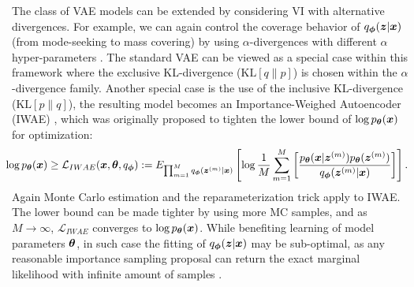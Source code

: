 The class of VAE models can be extended by considering VI with alternative divergences. For example, we can again control the coverage behavior of $q_{\bm{\phi}}(\bm{z}|\bm{x})$ (from mode-seeking to mass covering) by using $\alpha$-divergences with different $\alpha$ hyper-parameters \citep{miguel2015alpha,li2016renyi}. The standard VAE can be viewed as a special case within this framework where the exclusive KL-divergence ($\mathrm{KL}[q\|p]$) is chosen within the $\alpha$-divergence family. Another special case is the use of the inclusive KL-divergence ($\mathrm{KL}[p\|q]$), the resulting model becomes an Importance-Weighed Autoencoder (IWAE) \citep{burda2016iwae}, which was originally proposed to tighten the lower bound of $\log p_{\bm{\theta}}(\bm{x})$ for optimization:
%
\begin{equation}
\hspace{-0.7em}
\log p_{\bm{\theta}}(\bm{x}) \geq \mathcal{L}_{IWAE}(\bm{x}, \bm{\theta}, q_{\bm{\phi}})
:= E_{\prod_{m=1}^M q_{\bm{\phi}}(\bm{z}^{(m)}|\bm{x})}\left[\log \frac{1}{M} \sum_{m=1}^M \left[\frac{ p_{\bm{\theta}}(\bm{x}|\bm{z}^{(m)})p_{\bm{\theta}}(\bm{z}^{(m)})}{q_{\bm{\phi}}(\bm{z}^{(m)}|\bm{x})} \right] \right]. 
\end{equation}
%
Again Monte Carlo estimation and the reparameterization trick apply to IWAE. The lower bound can be made tighter by using more MC samples, and as $M \rightarrow \infty$, $\mathcal{L}_{IWAE}$ converges to $\log p_{\bm{\theta}}(\bm{x})$. While benefiting learning of model parameters $\bm{\theta}$, in such case the fitting of $q_{\bm{\phi}}(\bm{z} | \bm{x})$ may be sub-optimal, as any reasonable importance sampling proposal can return the exact marginal likelihood with infinite amount of samples \citep{rainforth2018tighter}. 



